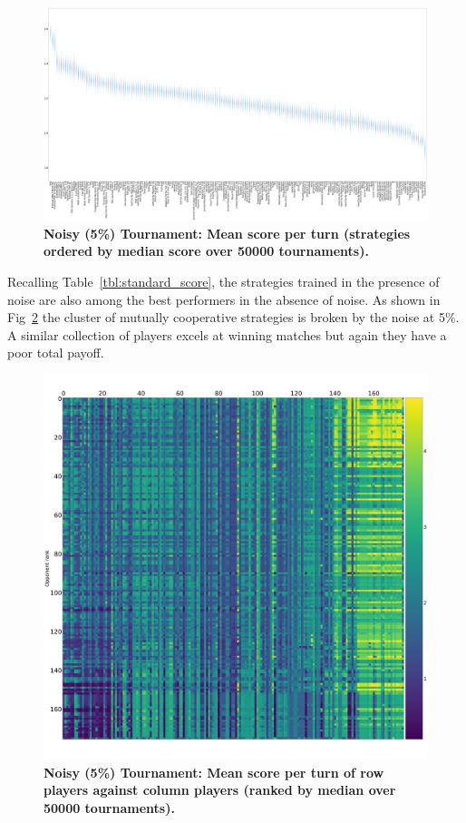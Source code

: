 \documentclass[10pt,letterpaper]{article}
\begin{document}
\begin{landscape}
    \begin{figure}[!hbtp]
        \centering
        \includegraphics[width=\paperwidth]{noisy_scores_boxplots.pdf}
        \caption{\bf Noisy (5\%) Tournament: Mean score per turn
            (strategies ordered by median score over 50000 tournaments).}
        \label{fig:standard_boxplot}
        \label{fig:noisy_score}
    \end{figure}
\end{landscape}

Recalling Table~\ref{tbl:standard_score}, the strategies trained in the presence
of noise are also among the best performers in the absence of noise. As shown in
Fig~\ref{fig:noisy_heatmap} the cluster of mutually cooperative strategies is
broken by the noise at 5\%. A similar collection of players excels at winning
matches but again they have a poor total payoff.

\begin{figure}[!hbtp]
    \centering
    \includegraphics[width=\textwidth]{noisy_scores_heatmap.pdf}
    \caption{\bf Noisy (5\%) Tournament: Mean score per turn of row players against
    column players (ranked by median over
        50000 tournaments).}
    \label{fig:noisy_heatmap}
\end{figure}
\end{document}
